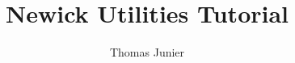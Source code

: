 \documentclass[a4paper,10pt]{report}
\title{Newick Utilities Tutorial}
\author{Thomas Junier}
\theoremstyle{definition}
\theoremstyle{definition}
\begin{document}
\maketitle
\tableofcontents







\label{chap_adv}

\appendix








\end{document}
